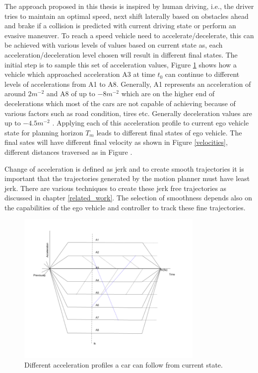 The approach proposed in this thesis is inspired by human driving, i.e., the driver tries to maintain an optimal speed, next shift laterally based on obstacles ahead and brake if a collision is predicted with current driving state or perform an evasive maneuver. To reach a speed vehicle need to accelerate/decelerate, this can be achieved with various levels of values based on current state as, each acceleration/deceleration level chosen will result in different final states. The initial step is to sample this set of acceleration values, Figure \ref{accelerations} shows how a vehicle which approached acceleration A3 at time $t_0$ can continue to different levels of accelerations from A1 to A8. Generally, A1 represents an acceleration of around $2m^{-2}$ and A8 of up to $-8m^{-2}$ which are on the higher end of decelerations which most of the cars are not capable of achieving because of various factors such as road condition, tires etc. Generally deceleration values are up to $-4.5m^{-2}$ \cite{denmark_breaking} \cite{accelerations_study} \cite{accelerations_study_2}. Applying each of this acceleration profile to current ego vehicle state for planning horizon $ T_m $ leads to different final states of ego vehicle. The final sates will have different final velocity as shown in Figure \ref{velocities}, different distances traversed as in Figure .

Change of acceleration is defined as jerk and to create smooth trajectories it is important that the trajectories generated by the motion planner must have least jerk. There are various techniques to create these jerk free trajectories as discussed in chapter \ref{related_work}. The selection of smoothness depends also on the capabilities of the ego vehicle and controller to track these fine trajectories.
 
 \begin{figure}[H]
    \centering
    \includegraphics[width=0.8\textwidth]{Images/accelerations.png}
    \caption{Different acceleration profiles a car can follow from current state.}
    \label{accelerations}
\end{figure}

